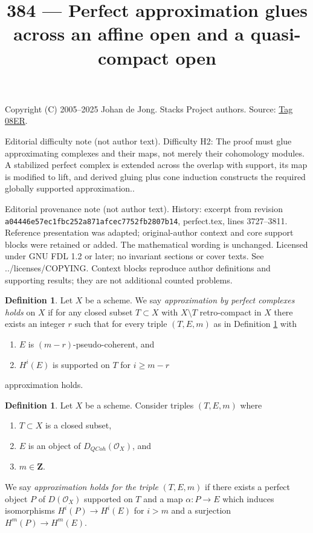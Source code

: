 \documentclass{amsart}
\theoremstyle{plain}
\theoremstyle{definition}
\newtheorem{definition}[subsection]{Definition}
\theoremstyle{remark}
\numberwithin{equation}{subsection}
\def\QCoh{\mathit{QCoh}}
\begin{document}
\title[Stacks Project, Tag 08ER]{384 --- Perfect approximation glues across an affine open and a quasi-compact open}
\maketitle
\noindent Copyright (C) 2005--2025 Johan de Jong. Stacks Project authors. Source: \href{https://stacks.math.columbia.edu/tag/08ER}{Tag 08ER}.

\noindent Editorial difficulty note (not author text). Difficulty H2: The proof must glue approximating complexes and their maps, not merely their cohomology modules. A stabilized perfect complex is extended across the overlap with support, its map is modified to lift, and derived gluing plus cone induction constructs the required globally supported approximation..

\noindent Editorial provenance note (not author text). History: excerpt from revision \texttt{a0444\allowbreak 6e57e\allowbreak c1fbc\allowbreak 252a8\allowbreak 71afc\allowbreak ec775\allowbreak 2fb28\allowbreak 07b14}, perfect.tex, lines 3727--3811. Reference presentation was adapted; original-author context and core support blocks were retained or added. The mathematical wording is unchanged. Licensed under GNU FDL 1.2 or later; no invariant sections or cover texts. See ../licenses/COPYING. Context blocks reproduce author definitions and supporting results; they are not additional counted problems.

\begin{definition}
\label{definition-approximation}
Let $X$ be a scheme. We say {\it approximation by perfect complexes holds}
on $X$ if for any closed subset $T \subset X$ with $X \setminus T$
retro-compact in $X$ there exists an integer $r$ such that
for every triple $(T, E, m)$ as in
Definition \ref{definition-approximation-holds} with
\begin{enumerate}
\item $E$ is $(m - r)$-pseudo-coherent, and
\item $H^i(E)$ is supported on $T$ for $i \geq m - r$
\end{enumerate}
approximation holds.
\end{definition}

\begin{definition}
\label{definition-approximation-holds}
Let $X$ be a scheme. Consider triples $(T, E, m)$ where
\begin{enumerate}
\item $T \subset X$ is a closed subset,
\item $E$ is an object of $D_\QCoh(\mathcal{O}_X)$, and
\item $m \in \mathbf{Z}$.
\end{enumerate}
We say {\it approximation holds for the triple} $(T, E, m)$ if
there exists a perfect object $P$ of $D(\mathcal{O}_X)$ supported on $T$
and a map $\alpha : P \to E$ which induces isomorphisms $H^i(P) \to H^i(E)$
for $i > m$ and a surjection $H^m(P) \to H^m(E)$.
\end{definition}
\end{document}
